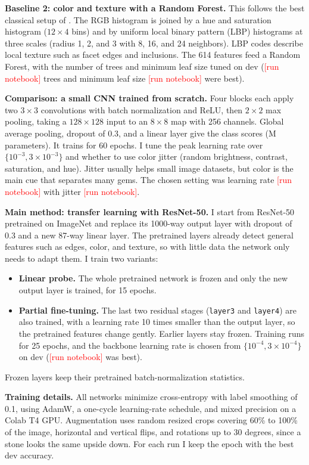 \documentclass{article}
\newcommand{\fillin}[1]{\textcolor{red}{[#1]}}
\newcommand{\pending}{\fillin{run notebook}}
\providecommand{\NClasses}{87}
\providecommand{\RFTrees}{\pending}\providecommand{\RFLeaf}{\pending}
\providecommand{\CNNLR}{\pending}\providecommand{\CNNJitter}{\pending}
\providecommand{\CNNEpochs}{60}\providecommand{\CNNBestEpoch}{\pending}
\providecommand{\FTBackboneLR}{\pending}\providecommand{\FTEpochs}{25}\providecommand{\FTBestEpoch}{\pending}
\providecommand{\LinEpochs}{15}\providecommand{\ErrModel}{the fine-tuned ResNet-50}
\begin{document}
\textbf{Baseline 2: color and texture with a Random Forest.} This follows the best classical setup of \citet{chow2022gemstone}. The RGB histogram is joined by a hue and saturation histogram ($12\times4$ bins) and by uniform local binary pattern (LBP) histograms at three scales (radius 1, 2, and 3 with 8, 16, and 24 neighbors). LBP codes describe local texture such as facet edges and inclusions. The 614 features feed a Random Forest, with the number of trees and minimum leaf size tuned on dev (\RFTrees{} trees and minimum leaf size \RFLeaf{} were best).

\textbf{Comparison: a small CNN trained from scratch.} Four blocks each apply two $3\times3$ convolutions with batch normalization and ReLU, then $2\times2$ max pooling, taking a $128\times128$ input to an $8\times8$ map with 256 channels. Global average pooling, dropout of 0.3, and a linear layer give the class scores (\CNNParams{}M parameters). It trains for \CNNEpochs{} epochs. I tune the peak learning rate over $\{10^{-3}, 3\times10^{-3}\}$ and whether to use color jitter (random brightness, contrast, saturation, and hue). Jitter usually helps small image datasets, but color is the main cue that separates many gems. The chosen setting was learning rate \CNNLR{} with jitter \CNNJitter{}.

\textbf{Main method: transfer learning with ResNet-50.} I start from ResNet-50 pretrained on ImageNet and replace its 1000-way output layer with dropout of 0.3 and a new \NClasses{}-way linear layer. The pretrained layers already detect general features such as edges, color, and texture, so with little data the network only needs to adapt them. I train two variants:
\begin{itemize}
\item \textbf{Linear probe.} The whole pretrained network is frozen and only the new output layer is trained, for \LinEpochs{} epochs.
\item \textbf{Partial fine-tuning.} The last two residual stages (\texttt{layer3} and \texttt{layer4}) are also trained, with a learning rate 10 times smaller than the output layer, so the pretrained features change gently. Earlier layers stay frozen. Training runs for \FTEpochs{} epochs, and the backbone learning rate is chosen from $\{10^{-4}, 3\times10^{-4}\}$ on dev (\FTBackboneLR{} was best).
\end{itemize}
Frozen layers keep their pretrained batch-normalization statistics.

\textbf{Training details.} All networks minimize cross-entropy with label smoothing of 0.1, using AdamW, a one-cycle learning-rate schedule, and mixed precision on a Colab T4 GPU. Augmentation uses random resized crops covering 60\% to 100\% of the image, horizontal and vertical flips, and rotations up to 30 degrees, since a stone looks the same upside down. For each run I keep the epoch with the best dev accuracy.
\end{document}
